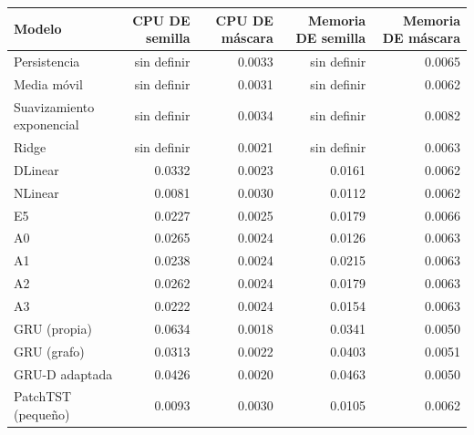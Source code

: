 \begin{tabular}{lrrrr}
\toprule
Modelo & CPU DE semilla & CPU DE máscara & Memoria DE semilla & Memoria DE máscara \\
\midrule
Persistencia & sin definir & 0.0033 & sin definir & 0.0065 \\
Media móvil & sin definir & 0.0031 & sin definir & 0.0062 \\
Suavizamiento exponencial & sin definir & 0.0034 & sin definir & 0.0082 \\
Ridge & sin definir & 0.0021 & sin definir & 0.0063 \\
DLinear & 0.0332 & 0.0023 & 0.0161 & 0.0062 \\
NLinear & 0.0081 & 0.0030 & 0.0112 & 0.0062 \\
E5 & 0.0227 & 0.0025 & 0.0179 & 0.0066 \\
A0 & 0.0265 & 0.0024 & 0.0126 & 0.0063 \\
A1 & 0.0238 & 0.0024 & 0.0215 & 0.0063 \\
A2 & 0.0262 & 0.0024 & 0.0179 & 0.0063 \\
A3 & 0.0222 & 0.0024 & 0.0154 & 0.0063 \\
GRU (propia) & 0.0634 & 0.0018 & 0.0341 & 0.0050 \\
GRU (grafo) & 0.0313 & 0.0022 & 0.0403 & 0.0051 \\
GRU-D adaptada & 0.0426 & 0.0020 & 0.0463 & 0.0050 \\
PatchTST (pequeño) & 0.0093 & 0.0030 & 0.0105 & 0.0062 \\
\bottomrule
\end{tabular}
